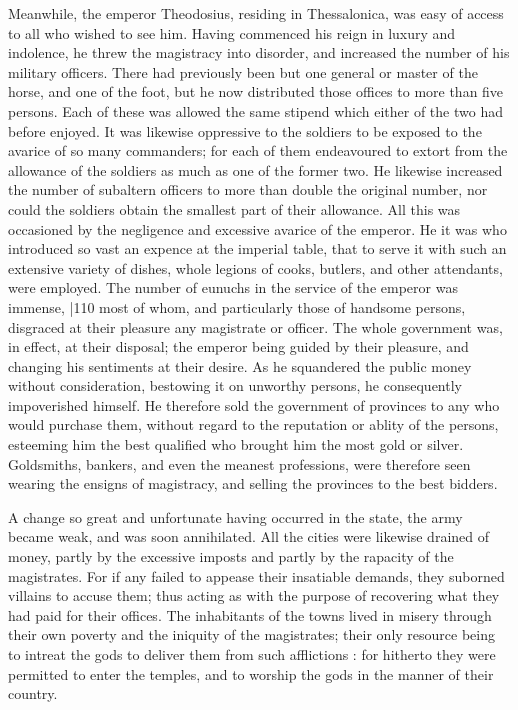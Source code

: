 Meanwhile, the emperor Theodosius, residing in Thessalonica, was easy of access to all who wished to see him. Having commenced his reign in luxury and indolence, he threw the magistracy into disorder, and increased the number of his military officers. There had previously been but one general or master of the horse, and one of the foot, but he now distributed those offices to more than five persons. Each of these was allowed the same stipend which either of the two had before enjoyed. It was likewise oppressive to the soldiers to be exposed to the avarice of so many commanders; for each of them endeavoured to extort from the allowance of the soldiers as much as one of the former two. He likewise increased the number of subaltern officers to more than double the original number, nor could the soldiers obtain the smallest part of their allowance. All this was occasioned by the negligence and excessive avarice of the emperor. He it was who introduced so vast an expence at the imperial table, that to serve it with such an extensive variety of dishes, whole legions of cooks, butlers, and other attendants, were employed. The number of eunuchs in the service of the emperor was immense,
|110
most of whom, and particularly those of handsome persons, disgraced at their pleasure any magistrate or officer. The whole government was, in effect, at their disposal; the emperor being guided by their pleasure, and changing his sentiments at their desire. As he squandered the public money without consideration, bestowing it on unworthy persons, he consequently impoverished himself. He therefore sold the government of provinces to any who would purchase them, without regard to the reputation or ablity of the persons, esteeming him the best qualified who brought him the most gold or silver. Goldsmiths, bankers, and even the meanest professions, were therefore seen wearing the ensigns of magistracy, and selling the provinces to the best bidders.

A change so great and unfortunate having occurred in the state, the army became weak, and was soon annihilated. All the cities were likewise drained of money, partly by the excessive imposts and partly by the rapacity of the magistrates. For if any failed to appease their insatiable demands, they suborned villains to accuse them; thus acting as with the purpose of recovering what they had paid for their offices. The inhabitants of the towns lived in misery through their own poverty and the iniquity of the magistrates; their only resource being to intreat the gods to deliver them from such afflictions : for hitherto they were permitted to enter the temples, and to worship the gods in the manner of their country.

